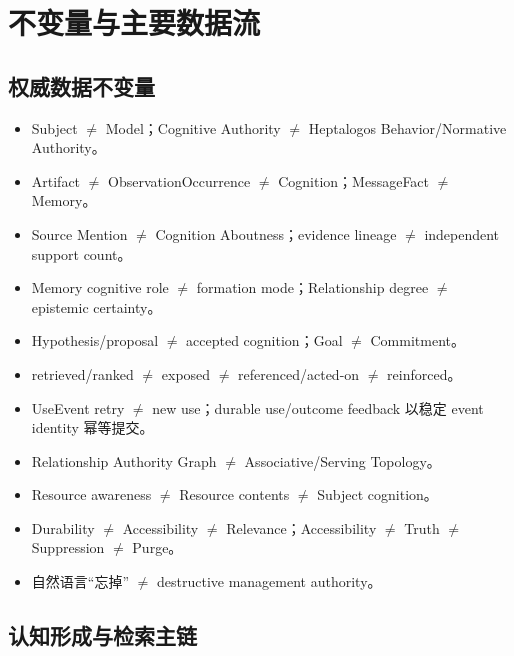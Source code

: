 \chapter{不变量与主要数据流}

\section{权威数据不变量}

\begin{itemize}
\item Subject $\neq$ Model；Cognitive Authority $\neq$ Heptalogos Behavior/Normative Authority。
\item Artifact $\neq$ ObservationOccurrence $\neq$ Cognition；MessageFact $\neq$ Memory。
\item Source Mention $\neq$ Cognition Aboutness；evidence lineage $\neq$ independent support count。
\item Memory cognitive role $\neq$ formation mode；Relationship degree $\neq$ epistemic certainty。
\item Hypothesis/proposal $\neq$ accepted cognition；Goal $\neq$ Commitment。
\item retrieved/ranked $\neq$ exposed $\neq$ referenced/acted-on $\neq$ reinforced。
\item UseEvent retry $\neq$ new use；durable use/outcome feedback 以稳定 event identity 幂等提交。
\item Relationship Authority Graph $\neq$ Associative/Serving Topology。
\item Resource awareness $\neq$ Resource contents $\neq$ Subject cognition。
\item Durability $\neq$ Accessibility $\neq$ Relevance；Accessibility $\neq$ Truth $\neq$ Suppression $\neq$ Purge。
\item 自然语言“忘掉” $\neq$ destructive management authority。
\end{itemize}

\section{认知形成与检索主链}


